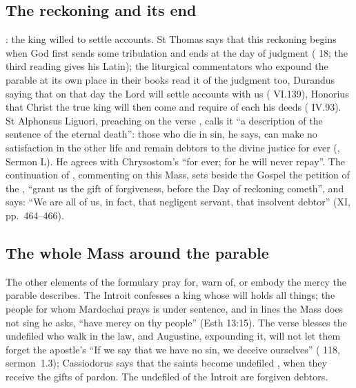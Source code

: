 \subsection{The reckoning and its end}

: the king willed to settle accounts. St Thomas
says that this reckoning begins when God first sends some tribulation and ends at
the day of judgment ( 18; the third reading gives his
Latin); the liturgical commentators who expound the parable at its own place in their books
read it of the judgment too, Durandus saying that on that day the Lord will settle
accounts with us ( VI.139), Honorius that Christ the true king will
then come and require of each his deeds ( IV.93). St Alphonsus
Liguori, preaching on the verse , calls it ``a
description of the sentence of the eternal death'': those who die in sin, he
says, can make no satisfaction in the other life and remain debtors to the divine
justice for ever (, Sermon L). He agrees with Chrysostom's ``for
ever; for he will never repay''. The continuation of ,
commenting on this Mass, sets beside the Gospel the petition of the , ``grant us the gift of forgiveness, before the Day of reckoning cometh'',
and says: ``We are all of us, in fact, that negligent servant, that insolvent
debtor'' (XI, pp.~464--466).

\subsection{The whole Mass around the parable}

The other elements of the formulary pray for, warn of, or embody the mercy the
parable describes. The Introit confesses a king whose will holds all things;
the people for whom Mardochai prays is under sentence, and in lines the Mass does
not sing he asks, ``have mercy on thy people'' (Esth 13:15). The verse blesses
the undefiled who walk in the law, and Augustine, expounding it, will not let them
forget the apostle's ``If we say that we have no sin, we deceive ourselves''
( 118, sermon~1.3); Cassiodorus says that the saints become
undefiled , when they receive the
gifts of pardon. The undefiled of the Introit are forgiven debtors.

